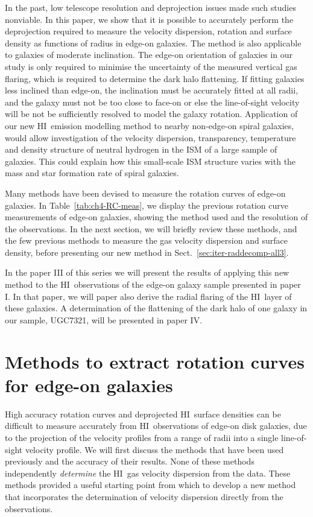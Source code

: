 \documentclass[traditabstract]{aa} %
\newcommand\HI{H{\small I}}
\begin{document}
In the past, low telescope resolution and deprojection issues made
such studies nonviable. In this paper, we show that it is possible to
accurately perform the deprojection required to measure the velocity
dispersion, rotation and surface density as functions of radius in
edge-on galaxies. The method is also applicable to galaxies of
moderate inclination. The edge-on orientation of galaxies in our study
is only required to minimise the uncertainty of the measured vertical
gas flaring, which is required to determine the dark halo flattening.
If fitting galaxies less inclined than edge-on, the inclination must
be accurately fitted at all radii, and the galaxy must not be too
close to face-on or else the line-of-sight velocity will be not be 
sufficiently resolved to model
the galaxy rotation. Application of our new \HI\ emission modelling 
method to nearby non-edge-on spiral galaxies, would allow investigation 
of the velocity dispersion, transparency,
temperature and density structure of neutral hydrogen in the ISM of a 
large sample of galaxies. 
This could explain how this small-scale ISM structure varies with the 
mass and star
formation rate of spiral galaxies.

Many methods have been devised to measure the rotation curves of
edge-on galaxies. In Table~\ref{tab:ch4-RC-meas}, we display the
previous rotation curve measurements of edge-on galaxies, showing the
method used and the resolution of the observations. In the next section, 
we will briefly review these methods, and the few previous
methods to measure the gas velocity dispersion and surface density,
before presenting our new method in Sect.~\ref{sec:iter-raddecomp-all3}.

In the paper III of this series 
we will present the results of applying this new
method to the \HI\ observations of the edge-on galaxy sample
presented in paper I. In that paper, we will paper also
derive the radial flaring of the \HI\ layer of these galaxies. 
A determination of the flattening
of the dark halo of one galaxy in our sample, UGC7321, will be 
presented in paper IV.

\section{Methods to extract rotation curves for edge-on galaxies}



High accuracy rotation curves and deprojected \HI\ surface densities
can be difficult to measure accurately from \HI\ observations of
edge-on disk galaxies, due to the projection of the velocity profiles
from a range of radii into a single line-of-sight velocity profile.
We will first discuss the methods that have been used previously and
the accuracy of their results. None of these methods independently {\it 
determine} the \HI\ gas velocity dispersion from the data. These methods 
provided a useful starting point from which to
develop a new method that incorporates the determination of velocity 
dispersion directly from the observations.
\end{document}
